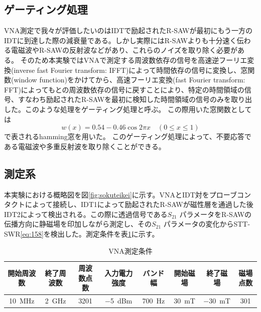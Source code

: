 \documentclass[dvipdfmx]{jsreport}
\numberwithin{equation}{chapter}
\numberwithin{table}{chapter}
\begin{document}
\subsection{ゲーティング処理}
VNA測定で我々が評価したいのはIDTで励起されたR-SAWが最初にもう一方のIDTに到達した際の減衰量である。しかし実際にはR-SAWよりも十分速く伝わる電磁波やR-SAWの反射波などがあり、これらのノイズを取り除く必要がある。
そのため本実験ではVNAで測定する周波数依存の信号を高速逆フーリエ変換(inverse fast Fourier transform: IFFT)によって時間依存の信号に変換し、窓関数(window function)をかけてから、高速フーリエ変換(fast Fourier transform: FFT)によってもとの周波数依存の信号に戻すことにより、特定の時間領域の信号、すなわち励起されたR-SAWを最初に検知した時間領域の信号のみを取り出した。このような処理をゲーティング処理と呼ぶ。
この際用いた窓関数としては
\begin{equation}
\label{eq:z6}
	w(x)=0.54-0.46 \cos 2\pi x\quad(0\le x\le 1)
\end{equation}
で表されるhamming窓を用いた。
このゲーティング処理によって、不要応答である電磁波や多重反射波を取り除くことができる。
\subsection{測定系}
本実験における概略図を図\ref{fig:sokuteikei}に示す。VNAとIDT対をプローブコンタクトによって接続し、IDT1によって励起されたR-SAWが磁性層を通過した後IDT2によって検出される。この際に透過信号である$S_{21}$ パラメータをR-SAWの伝播方向に静磁場を印加しながら測定し、その$S_{21}$ パラメータの変化からSTT-SWR\eqref{eq:158}を検出した。測定条件を表\ref{tab:3}に示す。
\begin{table}[H]
	\centering
	\caption{VNA測定条件}
	\label{tab:3}
	\begin{tabular}{ccccc|ccc}\hline \hline
		開始周波数&終了周波数&周波数点数&入力電力強度&バンド幅&開始磁場&終了磁場&磁場点数\\ \hline 
		\SI{10}{\mega \hertz}&\SI{2}{\giga \hertz}&3201&\SI{-5}{dBm}&\SI{700}{\hertz}&\SI{30}{\milli \tesla}&\SI{-30}{\milli \tesla}&301\\\hline\hline
	\end{tabular}
\end{table}
\end{document}
